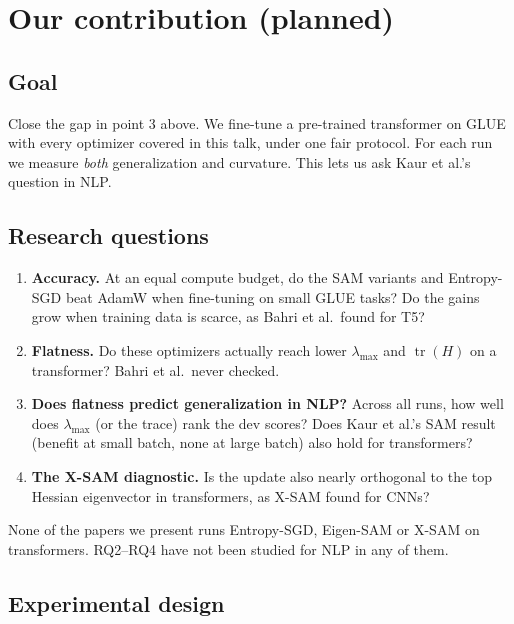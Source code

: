 \documentclass[11pt]{article}
\newcommand{\lmax}{\lambda_{\max}}
\newcommand{\tr}{\operatorname{tr}}
\theoremstyle{plain}
\begin{document}
\section{Our contribution (planned)}
\label{sec:contribution}

\subsection{Goal}

Close the gap in point 3 above. We fine-tune a pre-trained transformer on GLUE with every optimizer covered in this talk, under one fair protocol.
For each run we measure \emph{both} generalization and curvature. This lets us ask Kaur et al.'s question in NLP.

\subsection{Research questions}

\begin{enumerate}[label=\textbf{RQ\arabic*.}, leftmargin=*]
  \item \textbf{Accuracy.} At an equal compute budget, do the SAM variants and Entropy-SGD beat AdamW when fine-tuning on small GLUE tasks?
        Do the gains grow when training data is scarce, as Bahri et al.\ found for T5?
  \item \textbf{Flatness.} Do these optimizers actually reach lower $\lmax$ and $\tr(H)$ on a transformer? Bahri et al.\ never checked.
  \item \textbf{Does flatness predict generalization in NLP?} Across all runs, how well does $\lmax$ (or the trace) rank the dev scores?
        Does Kaur et al.'s SAM result (benefit at small batch, none at large batch) also hold for transformers?
  \item \textbf{The X-SAM diagnostic.} Is the update also nearly orthogonal to the top Hessian eigenvector in transformers, as X-SAM found for CNNs?
\end{enumerate}

None of the papers we present runs Entropy-SGD, Eigen-SAM or X-SAM on transformers. RQ2--RQ4 have not been studied for NLP in any of them.

\subsection{Experimental design}
\end{document}
